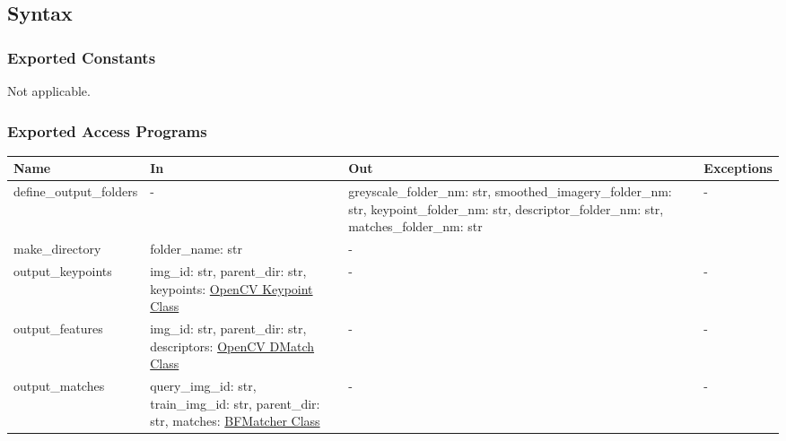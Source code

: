 \documentclass[12pt, titlepage]{article}
\begin{document}
\subsection{Syntax}

\subsubsection{Exported Constants}
Not applicable.
\subsubsection{Exported Access Programs}

\begin{center}
  \begin{tabular}{p{4cm} p{4cm} p{5cm} p{2cm}}
  \hline
  \textbf{Name} & \textbf{In} & \textbf{Out} & \textbf{Exceptions} \\
  \hline
  define\_output\_folders
  & - 
  & greyscale\_folder\_nm: str, \newline
  smoothed\_imagery\_folder\_nm: str, \newline
  keypoint\_folder\_nm: str, \newline
  descriptor\_folder\_nm: str, \newline
  matches\_folder\_nm: str
  & - \\
  \hline
  make\_directory
  & folder\_name: str
  & - \\
  \hline
  output\_keypoints 
  & img\_id: str, \newline
  parent\_dir: str, \newline
  keypoints: \href{https://docs.opencv.org/3.4/d2/d29/classcv_1_1KeyPoint.html}{OpenCV Keypoint Class}
  & -  
  & - \\
  \hline
  output\_features 
  & img\_id: str, \newline
  parent\_dir: str, \newline
  descriptors: \href{https://docs.opencv.org/3.4/d4/de0/classcv_1_1DMatch.html}{OpenCV DMatch Class}
  & - 
  & - \\
  \hline
  output\_matches 
  & query\_img\_id: str, \newline
  train\_img\_id: str, \newline
  parent\_dir: str, \newline
  matches: \href{https://docs.opencv.org/3.4/d3/da1/classcv_1_1BFMatcher.html}{BFMatcher Class}
  & - 
  & - \\
  \hline
  \end{tabular}
  \end{center}
  
\end{document}
